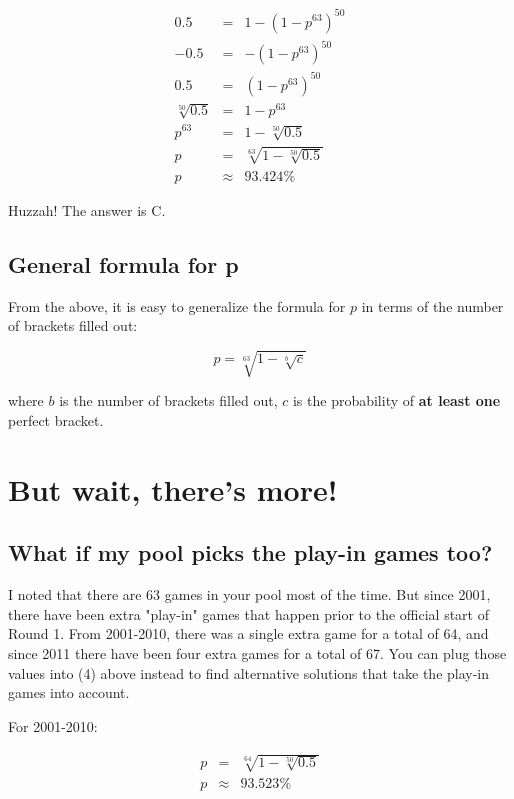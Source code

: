 \documentclass{article}
\begin{document}
\begin{eqnarray*}
    0.5 &=& 1 - (1 - p^{63})^{50}\\
    -0.5 &=& - (1 - p^{63})^{50}\\ 
    0.5 &=& (1 - p^{63})^{50}\\
    \sqrt[50]{0.5} &=& 1 - p^{63}\\
    p^{63} &=& 1 - \sqrt[50]{0.5}\\
    p &=& \sqrt[63]{1 - \sqrt[50]{0.5}}\\
    p &\approx& 93.424\%
\end{eqnarray*}

Huzzah! The answer is C. 

\subsection{General formula for p}
From the above, it is easy to generalize the formula for $p$ in terms of the number of brackets filled out:

\begin{equation} \label{eq:genp}
    p = \sqrt[63]{1 - \sqrt[b]{c}} 
\end{equation}

where $b$ is the number of brackets filled out, $c$ is the probability of \textbf{at least one} perfect bracket.

\section{But wait, there's more!}

\subsection{What if my pool picks the play-in games too?}

I noted that there are 63 games in your pool most of the time. But since 2001, there have been extra "play-in" games that happen prior to the official start of Round 1. From 2001-2010, there was a single extra game for a total of 64, and since 2011 there have been four extra games for a total of 67. You can plug those values into (4) above instead to find alternative solutions that take the play-in games into account.

\vspace{5mm}

For 2001-2010:

\begin{eqnarray*}
    p &=& \sqrt[64]{1 - \sqrt[50]{0.5}}\\
    p &\approx& 93.523\%
\end{eqnarray*}
\end{document}
